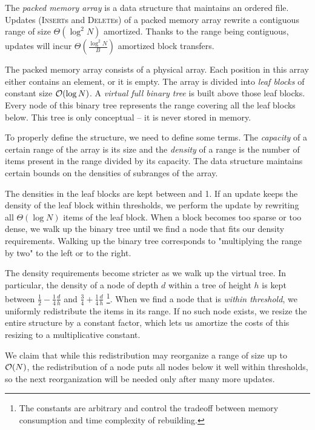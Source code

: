 The \textit{packed memory array} is a data structure that maintains an ordered
file. Updates (\textsc{Insert}s and \textsc{Delete}s) of a packed memory array
rewrite a contiguous range of size $\Theta(\log^2 N)$ amortized.
Thanks to the range being contiguous, updates will incur
$\Theta(\frac{\log^2 N}{B})$ amortized block transfers.

The packed memory array consists of a physical array. Each position in this
array either contains an element, or it is empty.
The array is divided into \textit{leaf blocks} of constant size $\mathcal{O}(\log N)$.
A \textit{virtual full binary tree} is built above those leaf blocks. Every
node of this binary tree represents the range covering all the leaf blocks below.
This tree is only conceptual -- it is never stored in memory.

To properly define the structure, we need to define some terms. The
\textit{capacity} of a certain range of the array is its size and the
\textit{density} of a range is the number of items present in the range divided
by its capacity.
The data structure maintains certain bounds on the densities of subranges of
the array.

The densities in the leaf blocks are kept between  %
and 1. If an update keeps the density of the leaf block within thresholds,
we perform the update by rewriting all $\Theta(\log N)$ items of the leaf block.
When a block becomes too sparse or too dense, we walk up the binary
tree until we find a node that fits our density requirements.
Walking up the binary tree corresponds to "multiplying the range by two"
to the left or to the right.

The density requirements become stricter as we walk up the virtual tree.
In particular, the density of a node of depth $d$ within a tree of height $h$
is kept between $\frac{1}{2}-\frac{1}{4}\frac{d}{h}$ and $\frac{3}{4}+\frac{1}{4}\frac{d}{h}$
\footnote{The constants are arbitrary and control the tradeoff
between memory consumption and time complexity of rebuilding.}.
When we find a node that is \textit{within threshold}, we uniformly redistribute
the items in its range. If no such node exists, we resize the entire structure
by a constant factor, which lets us amortize the costs of this resizing to
a multiplicative constant.

We claim that while this redistribution may reorganize a range of size up
to $\mathcal{O}(N)$, the redistribution of a node puts all nodes below it well within
thresholds, so the next reorganization will be needed only after many more
updates.


